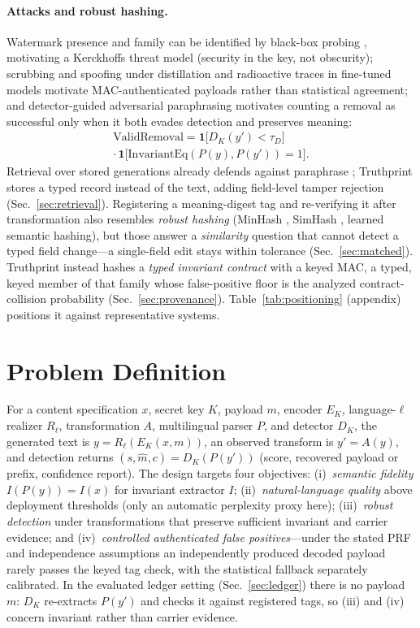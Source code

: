 \documentclass[journal]{IEEEtran}
\begin{document}
\paragraph{Attacks and robust hashing.}
\label{sec:relhash}
Watermark presence and family can be identified by black-box probing \cite{gloaguen2024blackbox}, motivating a Kerckhoffs threat model (security in the key, not obscurity); scrubbing and spoofing under distillation \cite{yi2025unifiedattacks} and radioactive traces in fine-tuned models \cite{sander2024radioactive} motivate MAC-authenticated payloads rather than statistical agreement; and detector-guided adversarial paraphrasing \cite{cheng2025adversarial} motivates counting a removal as successful only when it both evades detection and preserves meaning:
\begin{multline}
\label{eq:validremoval}
\mathrm{ValidRemoval}=\mathbf{1}\big[D_K(y')<\tau_D\big]\\
\cdot\,\mathbf{1}\big[\mathrm{InvariantEq}(P(y),P(y'))=1\big].
\end{multline}
Retrieval over stored generations already defends against paraphrase \cite{krishna2023retrieval}; Truthprint stores a typed record instead of the text, adding field-level tamper rejection (Sec.~\ref{sec:retrieval}). Registering a meaning-digest tag and re-verifying it after transformation also resembles \emph{robust hashing} (MinHash \cite{broder1997minhash}, SimHash \cite{charikar2002simhash}, learned semantic hashing), but those answer a \emph{similarity} question that cannot detect a typed field change---a single-field edit stays within tolerance (Sec.~\ref{sec:matched}). Truthprint instead hashes a \emph{typed invariant contract} with a keyed MAC, a typed, keyed member of that family whose false-positive floor is the analyzed contract-collision probability (Sec.~\ref{sec:provenance}). Table~\ref{tab:positioning} (appendix) positions it against representative systems.

\section{Problem Definition}
For a content specification $x$, secret key $K$, payload $m$, encoder $E_K$, language-$\ell$ realizer $R_\ell$, transformation $A$, multilingual parser $P$, and detector $D_K$, the generated text is $y=R_\ell(E_K(x,m))$, an observed transform is $y'=A(y)$, and detection returns $(s,\hat{m},c)=D_K(P(y'))$ (score, recovered payload or prefix, confidence report). The design targets four objectives: (i)~\emph{semantic fidelity} $I(P(y))=I(x)$ for invariant extractor $I$; (ii)~\emph{natural-language quality} above deployment thresholds (only an automatic perplexity proxy here); (iii)~\emph{robust detection} under transformations that preserve sufficient invariant and carrier evidence; and (iv)~\emph{controlled authenticated false positives}---under the stated PRF and independence assumptions an independently produced decoded payload rarely passes the keyed tag check, with the statistical fallback separately calibrated. In the evaluated ledger setting (Sec.~\ref{sec:ledger}) there is no payload $m$: $D_K$ re-extracts $P(y')$ and checks it against registered tags, so (iii) and (iv) concern invariant rather than carrier evidence.
\end{document}
